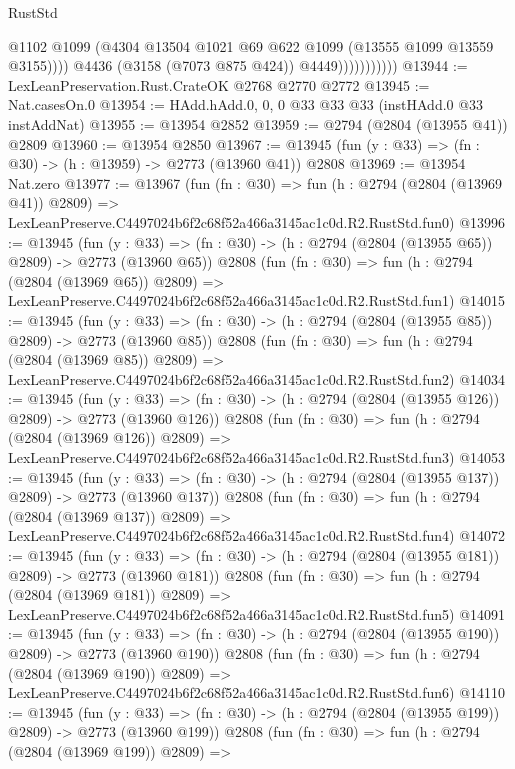 \begin{lexlean}{RustStd}
\begin{coremodule}
                              @1102
                              @1099
                              (@4304 @13504 @1021 @69 @622 @1099 (@13555 @1099 @13559 @3155))))
                          @4436
                          (@3158 (@7073 @875 @424))
                          @4449)))))))))))
@13944 := LexLeanPreservation.Rust.CrateOK @2768 @2770 @2772
@13945 := Nat.casesOn.{0}
@13954 := HAdd.hAdd.{0, 0, 0} @33 @33 @33 (instHAdd.{0} @33 instAddNat)
@13955 := @13954 @2852
@13959 := @2794 (@2804 (@13955 @41)) @2809
@13960 := @13954 @2850
@13967 := @13945 (fun (y : @33) => (fn : @30) -> (h : @13959) -> @2773 (@13960 @41)) @2808
@13969 := @13954 Nat.zero
@13977 := @13967
    (fun (fn : @30) =>
    fun (h : @2794 (@2804 (@13969 @41)) @2809) =>
    LexLeanPreserve.C4497024b6f2c68f52a466a3145ac1c0d.R2.RustStd.fun0)
@13996 := @13945
    (fun (y : @33) => (fn : @30) -> (h : @2794 (@2804 (@13955 @65)) @2809) -> @2773 (@13960 @65))
    @2808
    (fun (fn : @30) =>
    fun (h : @2794 (@2804 (@13969 @65)) @2809) =>
    LexLeanPreserve.C4497024b6f2c68f52a466a3145ac1c0d.R2.RustStd.fun1)
@14015 := @13945
    (fun (y : @33) => (fn : @30) -> (h : @2794 (@2804 (@13955 @85)) @2809) -> @2773 (@13960 @85))
    @2808
    (fun (fn : @30) =>
    fun (h : @2794 (@2804 (@13969 @85)) @2809) =>
    LexLeanPreserve.C4497024b6f2c68f52a466a3145ac1c0d.R2.RustStd.fun2)
@14034 := @13945
    (fun (y : @33) => (fn : @30) -> (h : @2794 (@2804 (@13955 @126)) @2809) -> @2773 (@13960 @126))
    @2808
    (fun (fn : @30) =>
    fun (h : @2794 (@2804 (@13969 @126)) @2809) =>
    LexLeanPreserve.C4497024b6f2c68f52a466a3145ac1c0d.R2.RustStd.fun3)
@14053 := @13945
    (fun (y : @33) => (fn : @30) -> (h : @2794 (@2804 (@13955 @137)) @2809) -> @2773 (@13960 @137))
    @2808
    (fun (fn : @30) =>
    fun (h : @2794 (@2804 (@13969 @137)) @2809) =>
    LexLeanPreserve.C4497024b6f2c68f52a466a3145ac1c0d.R2.RustStd.fun4)
@14072 := @13945
    (fun (y : @33) => (fn : @30) -> (h : @2794 (@2804 (@13955 @181)) @2809) -> @2773 (@13960 @181))
    @2808
    (fun (fn : @30) =>
    fun (h : @2794 (@2804 (@13969 @181)) @2809) =>
    LexLeanPreserve.C4497024b6f2c68f52a466a3145ac1c0d.R2.RustStd.fun5)
@14091 := @13945
    (fun (y : @33) => (fn : @30) -> (h : @2794 (@2804 (@13955 @190)) @2809) -> @2773 (@13960 @190))
    @2808
    (fun (fn : @30) =>
    fun (h : @2794 (@2804 (@13969 @190)) @2809) =>
    LexLeanPreserve.C4497024b6f2c68f52a466a3145ac1c0d.R2.RustStd.fun6)
@14110 := @13945
    (fun (y : @33) => (fn : @30) -> (h : @2794 (@2804 (@13955 @199)) @2809) -> @2773 (@13960 @199))
    @2808
    (fun (fn : @30) =>
    fun (h : @2794 (@2804 (@13969 @199)) @2809) =>

\end{coremodule}
\end{lexlean}
